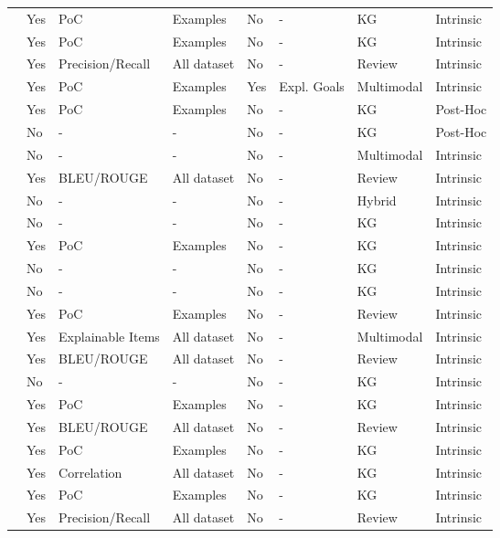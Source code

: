 \begin{xltabular}{\textwidth}{l|l|l|l|l|l|l|l}
\cite{TAO2022109300} & Yes & PoC & Examples & No & - & KG & Intrinsic \\
\cite{TAO2021107217} & Yes & PoC & Examples & No & - & KG & Intrinsic \\
\cite{YANG2021106687} & Yes & Precision/Recall & All dataset & No & - & Review & Intrinsic \\
\cite{LIU2020102099} & Yes & PoC & Examples & Yes & Expl. Goals & Multimodal & Intrinsic \\
\cite{LIANG202194} & Yes & PoC & Examples & No & - & KG & Post-Hoc \\
\cite{ZANON2022109333} & No & - & - & No & - & KG & Post-Hoc \\
\cite{PAZRUZA2024102497} & No & - & - & No & - & Multimodal & Intrinsic \\
\cite{AI2025129692} & Yes & BLEU/ROUGE & All dataset & No & - & Review & Intrinsic \\
\cite{WEI2023202} & No & - & - & No & - & Hybrid & Intrinsic \\
\cite{KAUR2023100507} & No & - & - & No & - & KG & Intrinsic \\
\cite{YANG2020106194} & Yes & PoC & Examples & No & - & KG & Intrinsic \\
\cite{LI2024112042} & No & - & - & No & - & KG & Intrinsic \\
\cite{WANG2020436} & No & - & - & No & - & KG & Intrinsic \\
\cite{GUO2021185} & Yes & PoC & Examples & No & - & Review & Intrinsic \\
\cite{MARKCHOM2023110258} & Yes & Explainable Items & All dataset & No & - & Multimodal & Intrinsic \\
\cite{HAO2025113113} & Yes & BLEU/ROUGE & All dataset & No & - & Review & Intrinsic \\
\cite{LIU2025113217} & No & - & - & No & - & KG & Intrinsic \\
\cite{WU2025129780} & Yes & PoC & Examples & No & - & KG & Intrinsic \\
\cite{AI2025129692} & Yes & BLEU/ROUGE & All dataset & No & - & Review & Intrinsic \\
\cite{10.1145/3269206.3271739} & Yes & PoC & Examples & No & - & KG & Intrinsic \\
\cite{10.1145/3357384.3357925} & Yes & Correlation & All dataset & No & - & KG & Intrinsic \\
\cite{10.1145/3219819.3219965} & Yes & PoC & Examples & No & - & KG & Intrinsic \\
\cite{10.1145/3178876.3186070} & Yes & Precision/Recall & All dataset & No & - & Review & Intrinsic \\

\end{xltabular}
